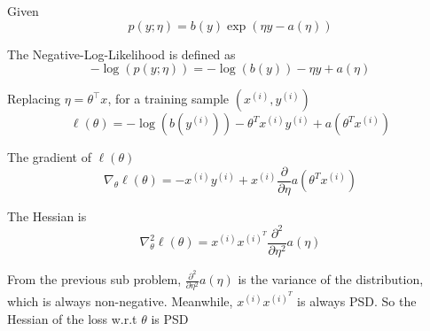 \begin{answer}


Given 
\begin{equation*}
    p(y; \eta) = b(y) \exp(\eta y - a(\eta))
\end{equation*}
    
The Negative-Log-Likelihood is defined as 
\begin{equation*}
    -\log(p(y; \eta)) = -\log(b(y)) - \eta y + a(\eta)
\end{equation*}

Replacing $\eta = \theta ^\top x $, for a training sample $(x^{(i)}, y^{(i)})$
\begin{equation*}
    \ell(\theta) = - \log(b(y^{(i)})) - \theta^T x^{(i)} y^{(i)} + a(\theta^T x^{(i)}) 
\end{equation*}

The gradient of $\ell(\theta)$
\begin{equation*}
    \nabla_{\theta} \ell(\theta) = -  x^{(i)} y^{(i)} + x^{(i)} \frac{\partial}{\partial \eta} a(\theta^T x^{(i)})
\end{equation*}

The Hessian is 
\begin{equation*}
    \nabla^2_{\theta} \ell(\theta) = x^{(i)} x^{(i)}^T \frac{\partial^2}{\partial \eta^2} a(\eta) 
\end{equation*}

From the previous sub problem, $\frac{\partial^2}{\partial \eta^2} a(\eta)$ is the variance of the distribution, which is always non-negative. Meanwhile, $x^{(i)} x^{(i)}^T$ is always PSD. So the Hessian of the loss w.r.t $\theta$ is PSD
\end{answer}
